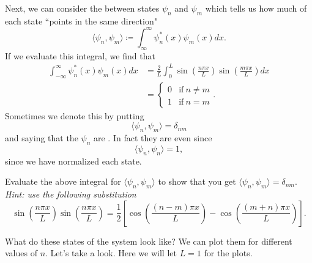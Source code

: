 Next, we can consider the  between states $\psi_n$ and $\psi_m$ which tells us how much of each state ``points in the same direction"
\[
\langle \psi_n,\psi_m \rangle \coloneqq \int_{\infty}^\infty \psi_n^*(x) \psi_m(x) dx.
\]
If we evaluate this integral, we find that
\begin{align*}
    \int_{-\infty}^\infty \psi_n^*(x)\psi_m(x)dx&= \frac{2}{L}\int_0^L \sin\left( \frac{n\pi x}{L}\right)\sin\left( \frac{m\pi x}{L}\right)dx\\
    &= \begin{cases} 0 &\textrm{if}~ n\neq m\\
    1 & \textrm{if}~ n=m\end{cases}.
\end{align*}
Sometimes we denote this by putting
\[
\langle \psi_n,\psi_m\rangle = \delta_{nm}
\]
and saying that the $\psi_n$ are . In fact they are even  since
\[
\langle \psi_n,\psi_n\rangle = 1,
\]
since we have normalized each state.
\begin{exercise}
Evaluate the above integral for $\langle \psi_n, \psi_m \rangle$ to show that you get $\langle \psi_n,\psi_m\rangle = \delta_{nm}$.  \emph{Hint: use the following substitution}
\[
\sin\left(\frac{n\pi x}{L}\right)\sin\left(\frac{n\pi x}{L}\right) =\frac{1}{2}\left[ \cos\left( \frac{(n-m)\pi x}{L} \right) - \cos\left( \frac{(m+n)\pi x}{L}\right)\right].
\]
\end{exercise}
What do these states of the system look like? We can plot them for different values of $n$. Let's take a look. Here we will let $L=1$ for the plots.

